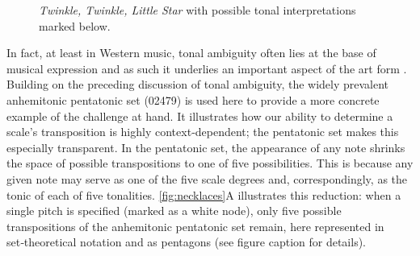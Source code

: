 \documentclass[10pt,twocolumn]{article}
\numberwithin{equation}{section} %
\begin{document}
    \begin{figure}[htbp]
        \centering
        \caption{\emph{Twinkle, Twinkle, Little Star} with possible tonal interpretations marked below.}        \label{fig:twinkle}
    \end{figure}

    In fact, at least in Western music, tonal ambiguity often lies at the base of musical expression and as such it underlies an important aspect of the art form \citep{NodenSkinner1984, Richards2017, Smith1992, Temperley2007, Uchida1990}.
    Building on the preceding discussion of tonal ambiguity, the widely prevalent anhemitonic pentatonic set (02479) is used here to provide a more concrete example of the challenge at hand.
    It illustrates how our ability to determine a scale’s transposition is highly context‑dependent; the pentatonic set makes this especially transparent.
    In the pentatonic set, the appearance of any note shrinks the space of possible transpositions to one of five possibilities.
    This is because any given note may serve as one of the five scale degrees and, correspondingly, as the tonic of each of five tonalities.
    \autoref{fig:necklaces}A illustrates this reduction: when a single pitch is specified (marked as a white node), only five possible transpositions of the anhemitonic pentatonic set remain, here represented in set‑theoretical notation and as pentagons (see figure caption for details).
\end{document}
